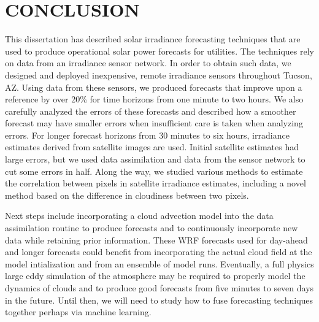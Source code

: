 \chapter{CONCLUSION}
\label{chap:conc}

This dissertation has described solar irradiance forecasting
techniques that are used to produce operational solar power forecasts
for utilities.
The techniques rely on data from an irradiance sensor network.
In order to obtain such data, we designed and deployed inexpensive,
remote irradiance sensors throughout Tucson, AZ.
Using data from these sensors, we produced forecasts that improve upon
a reference by over 20\% for time horizons from one minute to two
hours.
We also carefully analyzed the errors of these forecasts and described
how a smoother forecast may have smaller errors when insufficient care
is taken when analyzing errors.
For longer forecast horizons from 30 minutes to six hours, irradiance
estimates derived from satellite images are used.
Initial satellite estimates had large errors, but we used data
assimilation and data from the sensor network to cut some errors in
half.
Along the way, we studied various methods to estimate the correlation
between pixels in satellite irradiance estimates, including a novel
method based on the difference in cloudiness between two pixels.

Next steps include incorporating a cloud advection model into the data
assimilation routine to produce forecasts and to continuously
incorporate new data while retaining prior information.
These WRF forecasts used for day-ahead and longer forecasts could
benefit from incorporating the actual cloud field at the model
intialization and from an ensemble of model runs.
Eventually, a full physics large eddy simulation of the atmosphere may
be required to properly model the dynamics of clouds and to produce
good forecasts from five minutes to seven days in the future.
Until then, we will need to study how to fuse forecasting techniques
together perhaps via machine learning.


